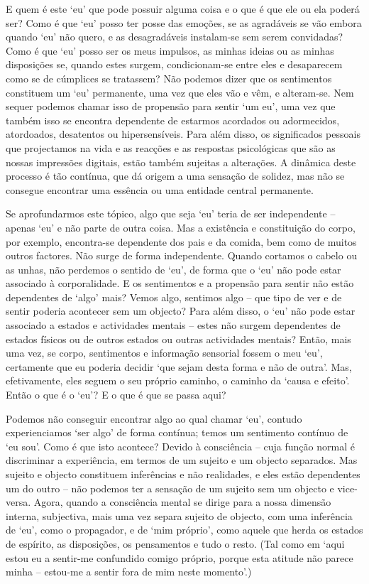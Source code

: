 E quem é este `eu' que pode possuir alguma coisa e o que é que ele ou ela poderá
ser? Como é que `eu' posso ter posse das emoções, se as agradáveis se vão embora
quando `eu' não quero, e as desagradáveis instalam-se sem serem convidadas? Como
é que `eu' posso ser os meus impulsos, as minhas ideias ou as minhas disposições
se, quando estes surgem, condicionam-se entre eles e desaparecem como se de
cúmplices se tratassem? Não podemos dizer que os sentimentos constituem um `eu'
permanente, uma vez que eles vão e vêm, e alteram-se. Nem sequer podemos chamar
isso de propensão para sentir `um eu', uma vez que também isso se encontra
dependente de estarmos acordados ou adormecidos, atordoados, desatentos ou
hipersensíveis. Para além disso, os significados pessoais que projectamos na
vida e as reacções e as respostas psicológicas que são as nossas impressões
digitais, estão também sujeitas a alterações. A dinâmica deste processo é tão
contínua, que dá origem a uma sensação de solidez, mas não se consegue encontrar
uma essência ou uma entidade central permanente.

Se aprofundarmos este tópico, algo que seja `eu' teria de ser independente --
apenas `eu' e não parte de outra coisa. Mas a existência e constituição do
corpo, por exemplo, encontra-se dependente dos pais e da comida, bem como de
muitos outros factores. Não surge de forma independente. Quando cortamos o
cabelo ou as unhas, não perdemos o sentido de `eu', de forma que o `eu' não pode
estar associado à corporalidade. E os sentimentos e a propensão para sentir não
estão dependentes de `algo' mais? Vemos algo, sentimos algo -- que tipo de ver e
de sentir poderia acontecer sem um objecto? Para além disso, o `eu' não pode
estar associado a estados e actividades mentais -- estes não surgem dependentes
de estados físicos ou de outros estados ou outras actividades mentais? Então,
mais uma vez, se corpo, sentimentos e informação sensorial fossem o meu `eu',
certamente que eu poderia decidir `que sejam desta forma e não de outra'. Mas,
efetivamente, eles seguem o seu próprio caminho, o caminho da `causa e efeito'.
Então o que é o `eu'? E o que é que se passa aqui?

Podemos não conseguir encontrar algo ao qual chamar `eu', contudo experienciamos
`ser algo' de forma contínua; temos um sentimento contínuo de `eu sou'. Como é
que isto acontece? Devido à consciência -- cuja função normal é discriminar a
experiência, em termos de um sujeito e um objecto separados. Mas sujeito e
objecto constituem inferências e não realidades, e eles estão dependentes um do
outro -- não podemos ter a sensação de um sujeito sem um objecto e vice-versa.
Agora, quando a consciência mental se dirige para a nossa dimensão interna,
subjectiva, mais uma vez separa sujeito de objecto, com uma inferência de `eu',
como o propagador, e de `mim próprio', como aquele que herda os estados de
espírito, as disposições, os pensamentos e tudo o resto. (Tal como em `aqui
estou eu a sentir-me confundido comigo próprio, porque esta atitude não parece
minha -- estou-me a sentir fora de mim neste momento'.)

